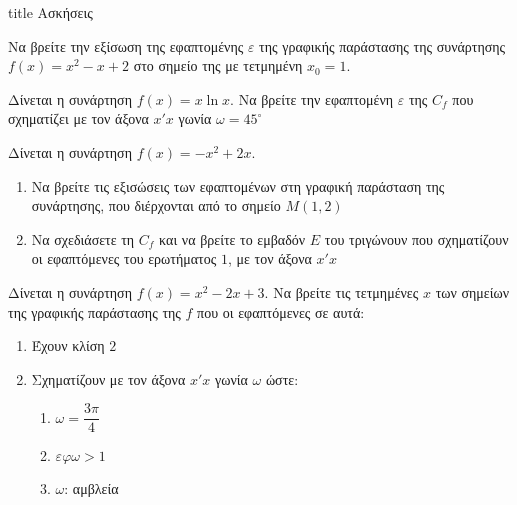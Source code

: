 \documentclass{presentation}
\begin{document}
\begin{frame}[noframenumbering]
  \vfill
  \centering
  \begin{beamercolorbox}[sep=8pt,center,shadow=true,rounded=true]{title}
    Ασκήσεις
  \end{beamercolorbox}
  \vfill
\end{frame}

\begin{askisi}
  Να βρείτε την εξίσωση της εφαπτομένης $ε$ της γραφικής παράστασης της συνάρτησης $f(x)=x^2-x+2$ στο σημείο της με τετμημένη $x_0=1$.

\end{askisi}

\begin{askisi}
  Δίνεται η συνάρτηση $f(x)=x\ln x$. Να βρείτε την εφαπτομένη $ε$ της $C_f$ που σχηματίζει με τον άξονα $x'x$ γωνία $ω=45^{\circ}$

\end{askisi}

\begin{askisi}
  Δίνεται η συνάρτηση $f(x)=-x^2+2x$.
  \begin{enumerate}
    \item<1-> Να βρείτε τις εξισώσεις των εφαπτομένων στη γραφική παράσταση της συνάρτησης, που διέρχονται από το σημείο $Μ(1,2)$
    \item<2-> Να σχεδιάσετε τη $C_f$ και να βρείτε το εμβαδόν $Ε$ του τριγώνουν που σχηματίζουν οι εφαπτόμενες του ερωτήματος $1$, με τον άξονα $x'x$
  \end{enumerate}

\end{askisi}

\begin{askisi}
  Δίνεται η συνάρτηση $f(x)=x^2-2x+3$. Να βρείτε τις τετμημένες $x$ των σημείων της γραφικής παράστασης της $f$ που οι εφαπτόμενες σε αυτά:
  \begin{enumerate}
    \item<1-> Έχουν κλίση $2$
    \item<2-> Σχηματίζουν με τον άξονα $x'x$ γωνία $ω$ ώστε:
          \begin{enumerate}
            \item<2-> $ω=\dfrac{3π}{4}$
            \item<3-> $εφω>1$
            \item<4-> $ω$: αμβλεία
          \end{enumerate}
  \end{enumerate}

\end{askisi}
\end{document}
